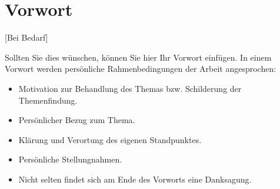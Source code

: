 \documentclass[./\jobname.tex]{subfiles}
\begin{document}
\chapter*{Vorwort}
[Bei Bedarf]\par
%
Sollten Sie dies wünschen, können Sie hier Ihr Vorwort einfügen.
In einem Vorwort werden persönliche Rahmenbedingungen der Arbeit angesprochen: 
\begin{itemize}
	\item  Motivation zur Behandlung des Themas bzw. Schilderung der Themenfindung.
	\item Persönlicher Bezug zum Thema.
	\item Klärung und Verortung des eigenen Standpunktes.
	\item Persönliche Stellungnahmen.
	\item Nicht selten findet sich am Ende des Vorworts eine Danksagung.
\end{itemize}
%
\end{document}
